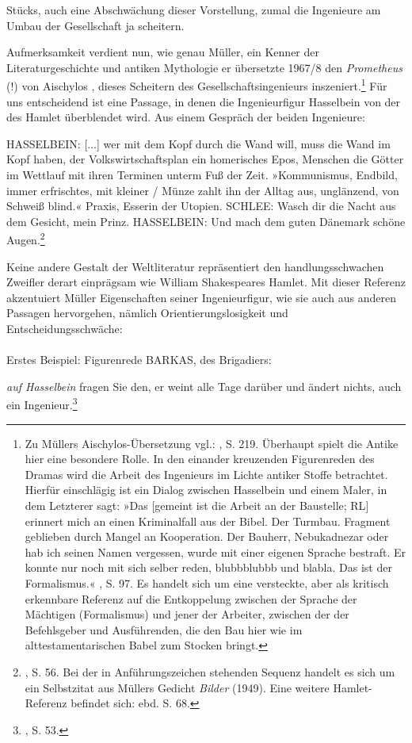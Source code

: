 \documentclass[%
	fontsize=10pt,%
	twoside,%
	headings=optiontoheadandtoc,%
	showtrims]{scrbook}
\renewenvironment{quote}{%
  \addmargin[\genericindent]{0pt}%
  \KOMAoptions{parskip=true}%
  \ifdim\parskip>0pt\else\addvspace{\intextsep}\fi
}{%
  \par
  \endaddmargin\vspace{\intextsep}
}
\begin{document}
Stücks, auch eine Abschwächung dieser Vorstellung, zumal die Ingenieure am Umbau der Gesellschaft ja scheitern.\par Aufmerksamkeit verdient nun, wie genau Müller, ein Kenner der Literaturgeschichte und antiken Mythologie \textendash{} er übersetzte 1967/8 den \emph{Prometheus} (!) von Aischylos \textendash{}, dieses Scheitern des Gesellschaftsingenieurs inszeniert.\footnote{Zu Müllers Aischylos-Übersetzung vgl.: \cite[][]{emmerich1996a}, S. 219. Überhaupt spielt die Antike hier eine besondere Rolle. In den einander kreuzenden Figurenreden des Dramas wird die Arbeit des Ingenieurs im Lichte antiker Stoffe betrachtet. Hierfür einschlägig ist ein Dialog zwischen Hasselbein und einem Maler, in dem Letzterer sagt: »Das {[}gemeint ist die Arbeit an der Baustelle; RL{]} erinnert mich an einen Kriminalfall aus der Bibel. Der Turmbau. Fragment geblieben durch Mangel an Kooperation. Der Bauherr, Nebukadnezar oder hab ich seinen Namen vergessen, wurde mit einer eigenen Sprache bestraft. Er konnte nur noch mit sich selber reden, blubbblubbb und blabla. Das ist der Formalismus.« \cite[][]{mueller1981a}, S. 97. Es handelt sich um eine versteckte, aber als kritisch erkennbare Referenz auf die Entkoppelung zwischen der Sprache der Mächtigen (Formalismus) und jener der Arbeiter, zwischen der der Befehlsgeber und Ausführenden, die den Bau hier wie im alttestamentarischen Babel zum Stocken bringt.}  Für uns entscheidend ist eine Passage, in denen die Ingenieurfigur Hasselbein von der des Hamlet überblendet wird. Aus einem Gespräch der beiden Ingenieure:\begin{quote}
\par HASSELBEIN: {[}...{]} wer mit dem Kopf durch die Wand will, muss die Wand im Kopf haben, der Volkswirtschaftsplan ein homerisches Epos, Menschen die Götter im Wettlauf mit ihren Terminen unterm Fuß der Zeit. »Kommunismus, Endbild, immer erfrischtes, mit kleiner / Münze zahlt ihn der Alltag aus, unglänzend, von Schweiß blind.« Praxis, Esserin der Utopien. SCHLEE: Wasch dir die Nacht aus dem Gesicht, mein Prinz. HASSELBEIN: Und mach dem guten Dänemark schöne Augen.\footnote{\cite[][]{mueller1981a}, S. 56. Bei der in Anführungszeichen stehenden Sequenz handelt es sich um ein Selbstzitat aus Müllers Gedicht \emph{Bilder} (1949). Eine weitere Hamlet-Referenz befindet sich: ebd. S. 68.} 
\end{quote}
\par Keine andere Gestalt der Weltliteratur repräsentiert den handlungsschwachen Zweifler derart einprägsam wie William Shakes\-peares Hamlet. Mit dieser Referenz akzentuiert Müller Eigenschaften seiner Ingenieurfigur, wie sie auch aus anderen Passagen hervorgehen, nämlich Orientierungslosigkeit und Entscheidungsschwäche: \- \protect\\ \\ Erstes Beispiel: Figurenrede BARKAS, des Brigadiers:\begin{quote}
\par \emph{auf Hasselbein} fragen Sie den, er weint alle Tage darüber und ändert nichts, auch ein Ingenieur.\footnote{\cite[][]{mueller1981a}, S. 53.} 
\end{quote}
\end{document}

